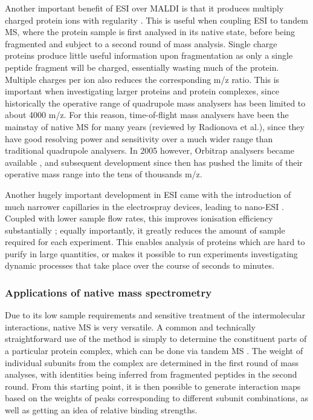 \documentclass[a4paper,11pt,twoside,openright]{scrbook}
\begin{document}
Another important benefit of ESI over MALDI is that it produces multiply charged protein ions with regularity \cite{Krusemark2009}. This is useful when coupling ESI to tandem MS, where the protein sample is first analysed in its native state, before being fragmented and subject to a second round of mass analysis. Single charge proteins produce little useful information upon fragmentation as only a single peptide fragment will be charged, essentially wasting much of the protein. Multiple charges per ion also reduces the corresponding m/z ratio. This is important when investigating larger proteins and protein complexes, since historically the operative range of quadrupole mass analysers has been limited to about 4000 m/z. For this reason, time-of-flight mass analysers have been the mainstay of native MS for many years (reviewed by Radionova et al.\cite{Radionova2016}), since they have good resolving power and sensitivity over a much wider range than traditional quadrupole analysers. In 2005 however, Orbitrap analysers became available \cite{Hu2005}, and subsequent development since then has pushed the limits of their operative mass range into the tens of thousands m/z.

Another hugely important development in ESI came with the introduction of much narrower capillaries in the electrospray devices, leading to nano-ESI \cite{Wilm1994}. Coupled with lower sample flow rates, this improves ionisation efficiency substantially \cite{El-Faramawy2005}; equally importantly, it greatly reduces the amount of sample required for each experiment. This enables analysis of proteins which are hard to purify in large quantities, or makes it possible to run experiments investigating dynamic processes that take place over the course of seconds to minutes.

\subsubsection{Applications of native mass spectrometry}
Due to its low sample requirements and sensitive treatment of the intermolecular interactions, native MS is very versatile. A common and technically straightforward use of the method is simply to determine the constituent parts of a particular protein complex, which can be done via tandem MS \cite{Sobott2002,Hernandez2007}. The weight of individual subunits from the complex are determined in the first round of mass analyses, with identities being inferred from fragmented peptides in the second round. From this starting point, it is then possible to generate interaction maps based on the weights of peaks corresponding to different subunit combinations, as well as getting an idea of relative binding strengths.
\end{document}

